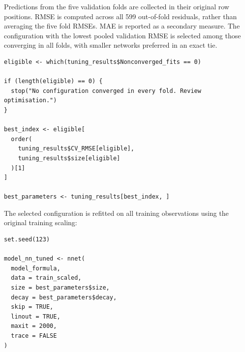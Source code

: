 \documentclass[11pt,a4paper]{article}
\begin{document}
Predictions from the five validation folds are collected in their original row positions. RMSE is computed across all 599 out-of-fold residuals, rather than averaging the five fold RMSEs. MAE is reported as a secondary measure. The configuration with the lowest pooled validation RMSE is selected among those converging in all folds, with smaller networks preferred in an exact tie.
\begin{lstlisting}
eligible <- which(tuning_results$Nonconverged_fits == 0)

if (length(eligible) == 0) {
  stop("No configuration converged in every fold. Review optimisation.")
}

best_index <- eligible[
  order(
    tuning_results$CV_RMSE[eligible],
    tuning_results$size[eligible]
  )[1]
]

best_parameters <- tuning_results[best_index, ]
\end{lstlisting}
The selected configuration is refitted on all training observations using the original training scaling:
\begin{lstlisting}
set.seed(123)

model_nn_tuned <- nnet(
  model_formula,
  data = train_scaled,
  size = best_parameters$size,
  decay = best_parameters$decay,
  skip = TRUE,
  linout = TRUE,
  maxit = 2000,
  trace = FALSE
)
\end{lstlisting}
\end{document}
